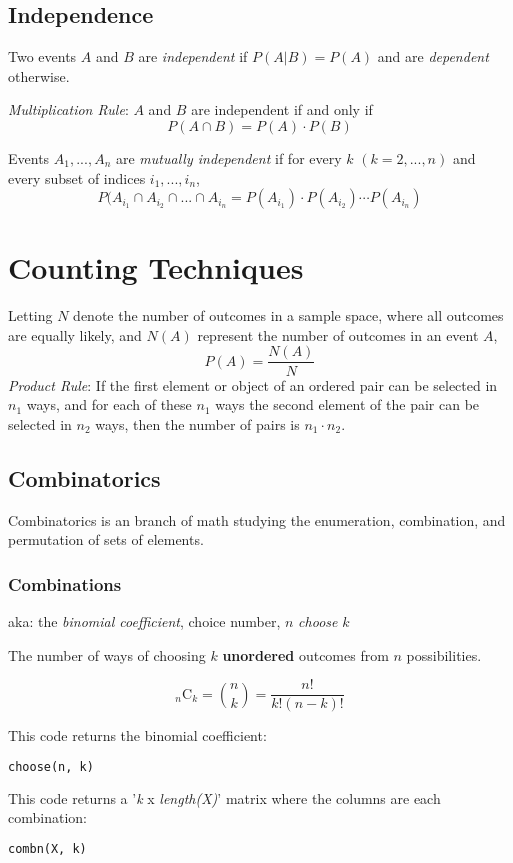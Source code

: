 \documentclass{article}
\begin{document}
\subsection*{Independence}
Two events $A$ and $B$ are \textit{independent} if $P(A|B) = P(A)$ and are \textit{dependent} otherwise.

\vspace{1em}
\textit{Multiplication Rule}: $A$ and $B$ are independent if and only if
$$ P(A \cap B) = P(A) \cdot P(B) $$

Events $A_1, ..., A_n$ are \textit{mutually independent} if for every $k$ $(k=2, ..., n)$ and every subset of indices $i_1, ..., i_n$,
$$ P(A_{i_1} \cap A_{i_2} \cap ... \cap A_{i_n} = P(A_{i_1}) \cdot P(A_{i_2}) \cdots P(A_{i_n}) $$

\section*{Counting Techniques}
Letting $N$ denote the number of outcomes in a sample space, where all outcomes are equally likely, and $N(A)$ represent the number of outcomes in an event $A$,
$$ P(A) = \frac{N(A)}{N} $$
\textit{Product Rule}: If the first element or object of an ordered pair can be selected in $n_1$ ways, and for each of these $n_1$ ways the second element of the pair can be selected in $n_2$ ways, then the number of pairs is $n_1 \cdot n_2$.

\subsection*{Combinatorics}
Combinatorics is an branch of math studying the enumeration, combination, and permutation of sets of elements.

\subsubsection*{Combinations}
aka: the \textit{binomial coefficient}, choice number, $n$ \textit{choose} $k$

The number of ways of choosing $k$ \textbf{unordered} outcomes from $n$ possibilities.

$$ {}_n \mathrm{C}_k = \binom{n}{k} = \frac{n!}{k! (n-k)!} $$

This code returns the binomial coefficient:
\begin{lstlisting}[language=Python]
choose(n, k)
\end{lstlisting}

This code returns a '\textit{k} x \textit{length(X)}' matrix where the columns are each combination:
\begin{lstlisting}[language=Python]
combn(X, k)
\end{lstlisting}
\end{document}
